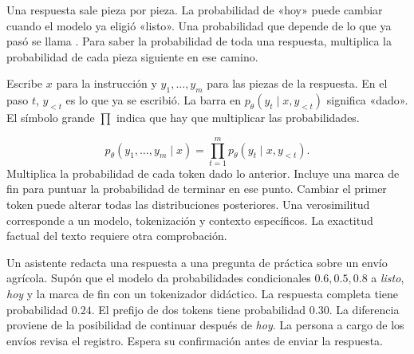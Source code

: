 {Una respuesta sale pieza por pieza. La probabilidad de «hoy» puede cambiar cuando el modelo ya eligió «listo». Una probabilidad que depende de lo que ya pasó se llama . Para saber la probabilidad de toda una respuesta, multiplica la probabilidad de cada pieza siguiente en ese camino.

Escribe \(x\) para la instrucción y \(y_1,\ldots,y_m\) para las piezas de la respuesta. En el paso \(t\), \(y_{<t}\) es lo que ya se escribió. La barra en \(p_\theta(y_t\mid x,y_{<t})\) significa «dado». El símbolo grande \(\prod\) indica que hay que multiplicar las probabilidades.}
\begin{equation}
 p_\theta(y_1,\ldots,y_m\mid x)=
 \prod_{t=1}^{m}p_\theta(y_t\mid x,y_{<t}).
 \label{eq:chain}
\end{equation}
{Multiplica la probabilidad de cada token dado lo anterior. Incluye una marca de fin para puntuar la probabilidad de terminar en ese punto. Cambiar el primer token puede alterar todas las distribuciones posteriores. Una verosimilitud corresponde a un modelo, tokenización y contexto específicos. La exactitud factual del texto requiere otra comprobación.}

{Un asistente redacta una respuesta a una pregunta de práctica sobre un envío agrícola. Supón que el modelo da probabilidades condicionales \(0.6,0.5,0.8\) a \emph{listo}, \emph{hoy} y la marca de fin con un tokenizador didáctico. La respuesta completa tiene probabilidad \(0.24\). El prefijo de dos tokens tiene probabilidad \(0.30\). La diferencia proviene de la posibilidad de continuar después de \emph{hoy}. La persona a cargo de los envíos revisa el registro. Espera su confirmación antes de enviar la respuesta.}

